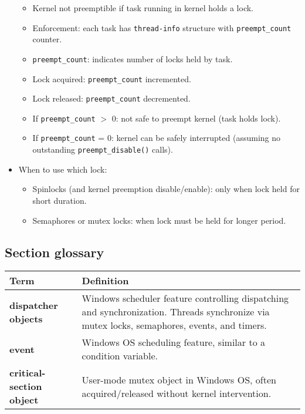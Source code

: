 \begin{itemize}
\begin{itemize}
        \item Kernel not preemptible if task running in kernel holds a lock.
        \item Enforcement: each task has \texttt{thread-info} structure with \texttt{preempt\_count} counter.
        \item \texttt{preempt\_count}: indicates number of locks held by task.
        \item Lock acquired: \texttt{preempt\_count} incremented.
        \item Lock released: \texttt{preempt\_count} decremented.
        \item If \texttt{preempt\_count} $>$ 0: not safe to preempt kernel (task holds lock).
        \item If \texttt{preempt\_count} = 0: kernel can be safely interrupted (assuming no outstanding \texttt{preempt\_disable()} calls).
    \end{itemize}
    \item When to use which lock:
    \begin{itemize}
        \item Spinlocks (and kernel preemption disable/enable): only when lock held for short duration.
        \item Semaphores or mutex locks: when lock must be held for longer period.
    \end{itemize}
\end{itemize}

\subsection{Section glossary}
\centering
\begin{tabular}{>{\raggedright}p{} >{\raggedright\arraybackslash}p{}}
\toprule
\textbf{Term} & \textbf{Definition} \\
\midrule
\textbf{dispatcher objects} & Windows scheduler feature controlling dispatching and synchronization. Threads synchronize via mutex locks, semaphores, events, and timers. \\
\textbf{event} & Windows OS scheduling feature, similar to a condition variable. \\
\textbf{critical-section object} & User-mode mutex object in Windows OS, often acquired/released without kernel intervention. \\
\bottomrule
\end{tabular}
\vspace{\baselineskip}
